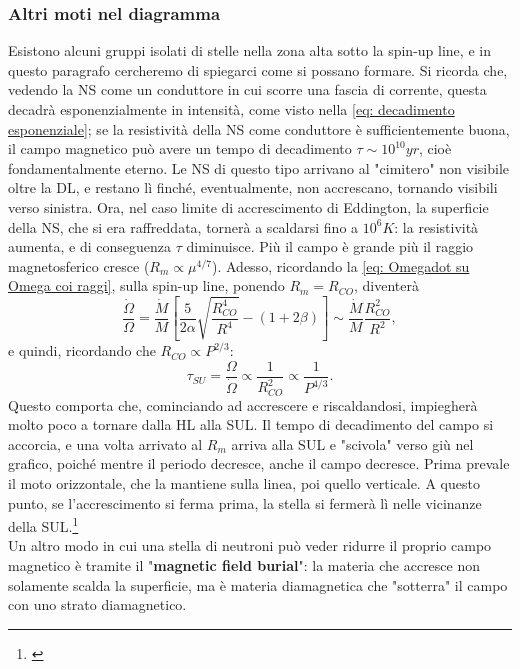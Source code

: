 \subsubsection{Altri moti nel diagramma}
Esistono alcuni gruppi isolati di stelle nella zona alta sotto la spin-up line, e in questo paragrafo cercheremo di spiegarci come si possano formare.
Si ricorda che, vedendo la NS come un conduttore in cui scorre una fascia di corrente, questa decadrà esponenzialmente in intensità, come visto nella \eqref{eq: decadimento esponenziale}; se la resistività della NS come conduttore è sufficientemente buona, il campo magnetico può avere un tempo di decadimento $\tau\sim10^{10}yr$, cioè fondamentalmente eterno.
Le NS di questo tipo arrivano al "cimitero" non visibile oltre la DL, e restano lì finché, eventualmente, non accrescano, tornando visibili verso sinistra.
Ora, nel caso limite di accrescimento di Eddington, la superficie della NS, che si era raffreddata, tornerà a scaldarsi fino a $10^6K$: la resistività aumenta, e di conseguenza $\tau$ diminuisce.
Più il campo è grande più il raggio magnetosferico cresce ($R_m\propto\mu^{4/7}$).
Adesso, ricordando la \eqref{eq: Omegadot su Omega coi raggi}, sulla spin-up line, ponendo $R_m=R_{CO}$, diventerà
\begin{equation}
    \frac{\dot{\Omega}}{\Omega} = \frac{\dot{M}}{M} \left[ \frac{5}{2\alpha} \sqrt{\frac{R_{CO}^4}{R^4}} - (1+2\beta) \right] \sim \frac{\dot{M}}{M}\frac{R_{CO}^2}{R^2},
\end{equation}
e quindi, ricordando che $R_{CO}\propto P^{2/3}$:
\begin{equation}
    \tau_{SU} = \frac{\Omega}{\dot{\Omega}}\propto\frac{1}{R_{CO}^2} \propto \frac{1}{P^{4/3}}.
\end{equation}
Questo comporta che, cominciando ad accrescere e riscaldandosi, impiegherà molto poco a tornare dalla HL alla SUL.
Il tempo di decadimento del campo si accorcia, e una volta arrivato al $R_m$ arriva alla SUL e "scivola" verso giù nel grafico, poiché mentre il periodo decresce, anche il campo decresce.
Prima prevale il moto orizzontale, che la mantiene sulla linea, poi quello verticale.
A questo punto, se l'accrescimento si ferma prima, la stella si fermerà lì nelle vicinanze della SUL.\footnote{\cite{Burderi_1996}}\vspace{2mm}\\
Un altro modo in cui una stella di neutroni può veder ridurre il proprio campo magnetico è tramite il "\textbf{magnetic field burial}": la materia che accresce non solamente scalda la superficie, ma è materia diamagnetica che "sotterra" il campo con uno strato diamagnetico.
